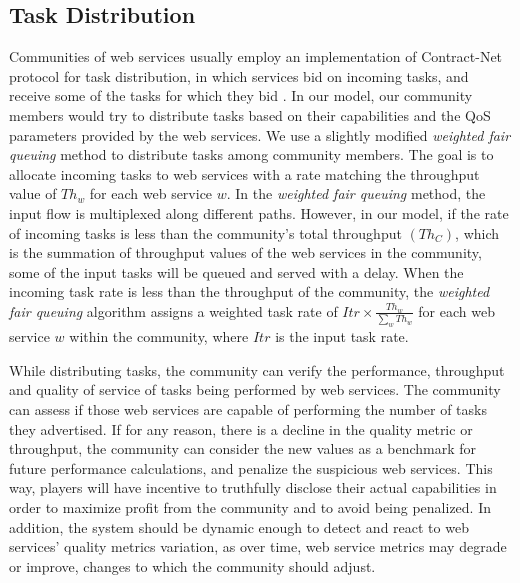 \subsection{Task Distribution}

Communities of web services usually employ an implementation of Contract-Net protocol for task distribution, in which services bid on incoming tasks, and receive some of the tasks for which they bid \cite{DBLP:journals/ijebr/MaamarSTBB09,DBLP:conf/aina/ElnaffarMYBT08}. In our model, our community members would try to distribute tasks based on their capabilities and the QoS parameters provided by the web services. We use a slightly modified \emph{weighted fair queuing} method to distribute tasks among community members. The goal is to allocate incoming tasks to web services with a rate matching the throughput value of $Th_{w}$ for each web service $w$. In the \emph{weighted fair queuing} method, the input flow is multiplexed along different paths. However, in our model, if the rate of incoming tasks is less than the community's total throughput $(Th_{C})$, which is the summation of throughput values of the web services in the community, some of the input tasks will be queued and served with a delay.
When the incoming task rate is less than the throughput of the community, the \emph{weighted fair queuing} algorithm assigns a weighted task rate of $Itr \times \frac{Th_{w}}{\sum_{w}{Th_{w}}}$ for each web service $w$ within the community, where $Itr$ is the input task rate.

While distributing tasks, the community can verify the performance, throughput and quality of service of tasks being performed by web services. The community can assess if those web services are capable of performing the number of tasks they advertised. If for any reason, there is a decline in the quality metric or throughput, the community can consider the new values as a benchmark for future performance calculations, and penalize the suspicious web services. This way, players will have incentive to truthfully disclose their actual capabilities in order to maximize profit from the community and to avoid being penalized. In addition, the system should be dynamic enough to detect and react to web services' quality metrics variation, as over time, web service metrics may degrade or improve, changes to which the community should adjust.

